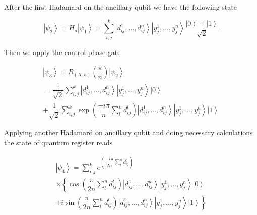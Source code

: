 \documentclass[pra,showkeys,twocolumn,showpacs]{revtex4-1}
\begin{document}
After the first Hadamard on the ancillary qubit we have the following state

\begin{equation}
    \left| \psi_2 \right\rangle = H_a\left| \psi_1 \right\rangle = 
    \sum\limits_{i, j}^{k} 
    \left| d^1_{ij}, \dots, d^n_{ij} \right\rangle 
    \left| y^1_j, \dots, y^n_j \right\rangle
    \dfrac{\left| 0 \right\rangle + \left| 1 \right\rangle}{\sqrt{2}}
\end{equation}

Then we apply the control phase gate

\begin{multline}
    \left| \psi_3 \right\rangle = R_{(X,a)}\left(\dfrac{\pi}{n}\right)\left| \psi_2 \right\rangle
    \\ = \dfrac{1}{\sqrt{2}}
				\sum\limits_{i, j}^{k} 
				\left| d^1_{ij}, \dots, d^n_{ij} \right\rangle 
        \left| y^1_j, \dots, y^n_j \right\rangle 
        \left| 0 \right\rangle
        \\ + \dfrac{1}{\sqrt{2}}
				\sum\limits_{i, j}^{k}
        \exp\left(\dfrac{-i \pi}{n}\sum\limits_l^n d^l_{ij} \right)
        \left| d^1_{ij}, \dots, d^n_{ij} \right\rangle 
        \left| y^1_j, \dots, y^n_j \right\rangle 
        \left| 1 \right\rangle
\end{multline}




Applying another Hadamard on ancillary qubit and doing necessary calculations the state of quantum register reads

\begin{multline}
    \left| \psi_4 \right\rangle = 
    \sum\limits_{i, j}^{k} 
    e^{\left(\dfrac{-i \pi}{2n}\sum\limits_l^n d^l_{ij} \right)}
		\\ \times
        \left\{\cos\left(\dfrac{\pi}{2n}\sum\limits_l^n d^l_{ij} \right)
        \left| d^1_{ij}, \dots, d^n_{ij} \right\rangle 
        \left| y^1_j, \dots, y^n_j \right\rangle 
        \left| 0 \right\rangle\right.
        \\+ 
        \left. i \sin\left(\dfrac{\pi}{2n}\sum\limits_l^n d^l_{ij} \right)
        \left| d^1_{ij}, \dots, d^n_{ij} \right\rangle 
        \left| y^1_j, \dots, y^n_j \right\rangle 
        \left| 1 \right\rangle\right\}
\end{multline}
\end{document}
